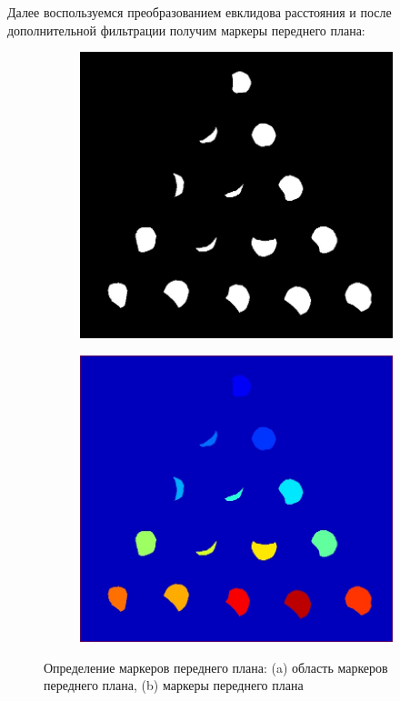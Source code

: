 Далее воспользуемся преобразованием евклидова расстояния и после дополнительной фильтрации получим маркеры переднего плана:

\begin{figure}[ht!]
    \centering
    \begin{subfigure}{0.4\textwidth}
        \includegraphics[width=\textwidth]{images/transformed_images/3/Fg.jpg}
        \caption{}
        \label{img:bin_fg}
    \end{subfigure}
    \begin{subfigure}{0.4\textwidth}
        \includegraphics[width=\textwidth]{images/transformed_images/3/Jet_fg_markers.jpg}
        \caption{}
        \label{img:jet_fg}
    \end{subfigure}
    \caption{Определение маркеров переднего плана: (a) область маркеров переднего плана, (b) маркеры переднего плана}
    \label{img:FG}
\end{figure} 

